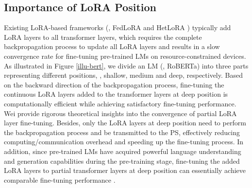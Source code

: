 \subsection{Importance of LoRA Position}
\vspace{-0.1cm}
\label{lora-position}
Existing LoRA-based frameworks (\eg, FedLoRA \cite{zhang2023fedpetuning} and HetLoRA \cite{cho2023heterogeneous}) typically add LoRA layers to all transformer layers, which requires the complete backpropagation process to update all LoRA layers \cite{kaddour2023challenges} and results in a slow convergence rate for fine-tuning pre-trained LMs on resource-constrained devices.
As illustrated in Figure \ref{illu-bert}, we divide an LM (\eg, RoBERTa) into three parts representing different positions, \ie, shallow, medium and deep, respectively.
Based on the backward direction of the backpropagation process, fine-tuning the continuous LoRA layers added to the transformer layers at deep position is computationally efficient while achieving satisfactory fine-tuning performance. 
Wei \etal \cite{wei2024flexora} provide rigorous theoretical insights into the convergence of partial LoRA layer fine-tuning.
Besides, only the LoRA layers at deep position need to perform the backpropagation process and be transmitted to the PS, effectively reducing computing/communication overhead and speeding up the fine-tuning process.
In addition, since pre-trained LMs have acquired powerful language understanding and generation capabilities during the pre-training stage, fine-tuning the added LoRA layers to partial transformer layers at deep position can essentially achieve comparable fine-tuning performance \cite{guo2019spottune, lin2021fednlp, zhang2023adaptive}. 

